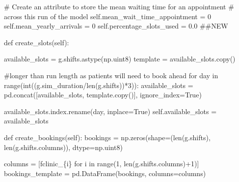 \documentclass[
  letterpaper,
  DIV=11,
  numbers=noendperiod]{scrreprt}
\newenvironment{Shaded}{}{}
\newcommand{\BuiltInTok}[1]{\textcolor[rgb]{0.84,0.23,0.29}{#1}}
\newcommand{\CommentTok}[1]{\textcolor[rgb]{0.42,0.45,0.49}{#1}}
\newcommand{\ControlFlowTok}[1]{\textcolor[rgb]{0.84,0.23,0.29}{#1}}
\newcommand{\DecValTok}[1]{\textcolor[rgb]{0.00,0.36,0.77}{#1}}
\newcommand{\FloatTok}[1]{\textcolor[rgb]{0.00,0.36,0.77}{#1}}
\newcommand{\KeywordTok}[1]{\textcolor[rgb]{0.84,0.23,0.29}{#1}}
\newcommand{\NormalTok}[1]{\textcolor[rgb]{0.14,0.16,0.18}{#1}}
\newcommand{\OperatorTok}[1]{\textcolor[rgb]{0.14,0.16,0.18}{#1}}
\newcommand{\SpecialCharTok}[1]{\textcolor[rgb]{0.00,0.36,0.77}{#1}}
\newcommand{\SpecialStringTok}[1]{\textcolor[rgb]{0.01,0.18,0.38}{#1}}
\newcommand{\StringTok}[1]{\textcolor[rgb]{0.01,0.18,0.38}{#1}}
\newcommand{\VariableTok}[1]{\textcolor[rgb]{0.89,0.38,0.04}{#1}}
\begin{document}
\begin{Shaded}
\begin{Highlighting}[]
        \CommentTok{\# Create an attribute to store the mean waiting time for an appointment}
        \CommentTok{\# across this run of the model}
        \VariableTok{self}\NormalTok{.mean\_wait\_time\_appointment }\OperatorTok{=} \DecValTok{0}
        \VariableTok{self}\NormalTok{.mean\_yearly\_arrivals }\OperatorTok{=} \DecValTok{0}
        \VariableTok{self}\NormalTok{.percentage\_slots\_used }\OperatorTok{=} \FloatTok{0.0} \CommentTok{\#\#NEW}

    \KeywordTok{def}\NormalTok{ create\_slots(}\VariableTok{self}\NormalTok{):}

\NormalTok{        available\_slots }\OperatorTok{=}\NormalTok{ g.shifts.astype(np.uint8)}
\NormalTok{        template }\OperatorTok{=}\NormalTok{ available\_slots.copy()}

        \CommentTok{\#longer than run length as patients will need to book ahead}
        \ControlFlowTok{for}\NormalTok{ day }\KeywordTok{in} \BuiltInTok{range}\NormalTok{(}\BuiltInTok{int}\NormalTok{((g.sim\_duration}\OperatorTok{/}\BuiltInTok{len}\NormalTok{(g.shifts))}\OperatorTok{*}\DecValTok{3}\NormalTok{)):}
\NormalTok{            available\_slots }\OperatorTok{=}\NormalTok{ pd.concat([available\_slots, template.copy()],}
\NormalTok{                                         ignore\_index}\OperatorTok{=}\VariableTok{True}\NormalTok{)}

\NormalTok{        available\_slots.index.rename(}\StringTok{\textquotesingle{}day\textquotesingle{}}\NormalTok{, inplace}\OperatorTok{=}\VariableTok{True}\NormalTok{)}
        \VariableTok{self}\NormalTok{.available\_slots }\OperatorTok{=}\NormalTok{ available\_slots}

    \KeywordTok{def}\NormalTok{ create\_bookings(}\VariableTok{self}\NormalTok{):}
\NormalTok{        bookings }\OperatorTok{=}\NormalTok{ np.zeros(shape}\OperatorTok{=}\NormalTok{(}\BuiltInTok{len}\NormalTok{(g.shifts), }\BuiltInTok{len}\NormalTok{(g.shifts.columns)), dtype}\OperatorTok{=}\NormalTok{np.uint8)}

\NormalTok{        columns }\OperatorTok{=}\NormalTok{ [}\SpecialStringTok{f\textquotesingle{}clinic\_}\SpecialCharTok{\{}\NormalTok{i}\SpecialCharTok{\}}\SpecialStringTok{\textquotesingle{}} \ControlFlowTok{for}\NormalTok{ i }\KeywordTok{in} \BuiltInTok{range}\NormalTok{(}\DecValTok{1}\NormalTok{, }\BuiltInTok{len}\NormalTok{(g.shifts.columns)}\OperatorTok{+}\DecValTok{1}\NormalTok{)]}
\NormalTok{        bookings\_template }\OperatorTok{=}\NormalTok{ pd.DataFrame(bookings, columns}\OperatorTok{=}\NormalTok{columns)}


\end{Highlighting}
\end{Shaded}
\end{document}
